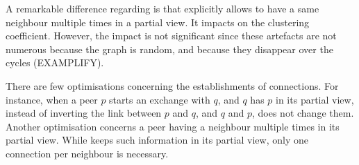 A remarkable difference regarding \CYCLON{} is that \SCAMPLON{} explicitly
allows to have a same neighbour multiple times in a partial view. It impacts on
the clustering coefficient. However, the impact is not significant since these
artefacts are not numerous because the graph is random, and because they
disappear over the \SCAMPLON{} cycles (EXAMPLIFY).

There are few optimisations concerning the establishments of connections. For
instance, when a peer $p$ starts an exchange with $q$, and $q$ has $p$ in its
partial view, instead of inverting the link between $p$ and $q$, and $q$ and
$p$, \SCAMPLON{} does not change them. Another optimisation concerns a peer
having a neighbour multiple times in its partial view. While \SCAMPLON{} keeps
such information in its partial view, only one connection per neighbour is
necessary.

